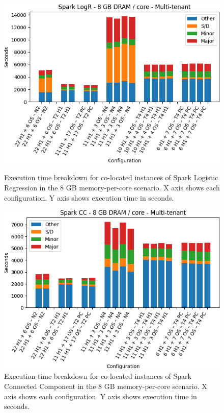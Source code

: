 \begin{figure}[thbp]
        \centering
    \includegraphics[width=\linewidth]{./fig/logr64.png}
    \caption{Execution time breakdown for co-located instances of Spark
    Logistic Regression in the 8 GB memory-per-core scenario. X axis shows each configuration.
	Y axis shows execution time in seconds.}
    \label{fig:logr64}

    \includegraphics[width=\linewidth]{./fig/cc64.png}
    \caption{Execution time breakdown for co-located instances of Spark
    Connected Component in the 8 GB memory-per-core scenario. X axis shows each configuration.
	Y axis shows execution time in seconds.}
    \label{fig:cc64}
\end{figure}
\iffalse
